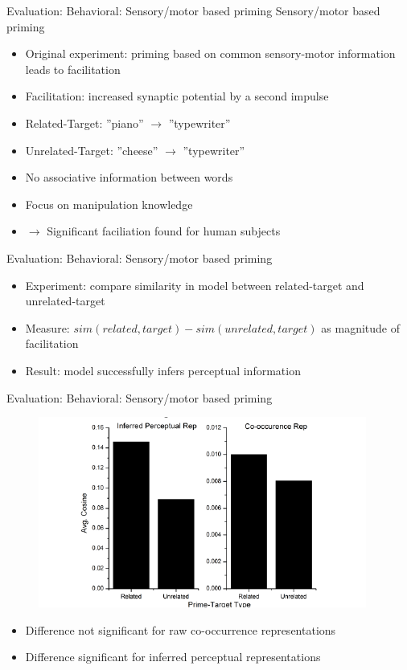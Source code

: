 \documentclass[12pt,a4paper]{beamer}
\begin{document}
\begin{frame}{Evaluation: Behavioral: Sensory/motor based priming}
Sensory/motor based priming
\begin{itemize}
\item Original experiment: priming based on common sensory-motor information leads to facilitation
\item Facilitation: increased synaptic potential by a second impulse
\item Related-Target: ''piano'' $\to$ ''typewriter''
\item Unrelated-Target: ''cheese'' $\to$ ''typewriter''
\item No associative information between words
\item Focus on manipulation knowledge
\item $\to$ Significant faciliation found for human subjects
\end{itemize}
\end{frame}

\begin{frame}{Evaluation: Behavioral: Sensory/motor based priming}
\begin{itemize}
\item Experiment: compare similarity in model between related-target and unrelated-target
\item Measure: $sim(related,target) - sim(unrelated,target)$ as magnitude of facilitation
\item Result: model successfully infers perceptual information
\end{itemize}
\end{frame}

\begin{frame}{Evaluation: Behavioral: Sensory/motor based priming}
\begin{figure}
\includegraphics[scale=0.7]{figure_4_perceptual_priming_results.png}

\end{figure}
\begin{itemize}
\item Difference not significant for raw co-occurrence representations
\item Difference significant for inferred perceptual representations
\end{itemize}

\end{frame}
\end{document}
